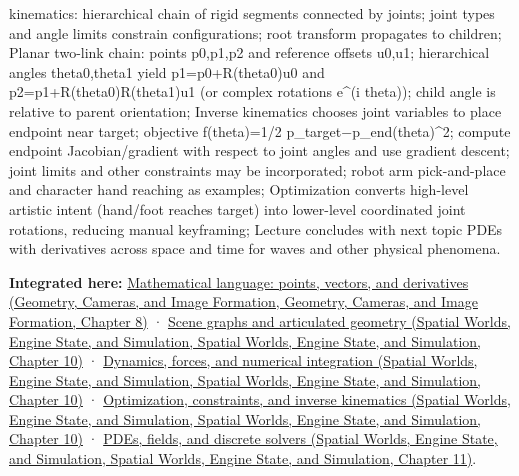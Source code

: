 kinematics: hierarchical chain of rigid segments connected by joints; joint types and angle limits constrain configurations; root transform propagates to children; Planar two-link chain: points p0,p1,p2 and reference offsets u0,u1; hierarchical angles theta0,theta1 yield p1=p0+R(theta0)u0 and p2=p1+R(theta0)R(theta1)u1 (or complex rotations e\^{}(i theta)); child angle is relative to parent orientation; Inverse kinematics chooses joint variables to place endpoint near target; objective f(theta)=1/2 \textbar\textbar p\_target−p\_end(theta)\textbar\textbar\^{}2; compute endpoint Jacobian/gradient with respect to joint angles and use gradient descent; joint limits and other constraints may be incorporated; robot arm pick-and-place and character hand reaching as examples; Optimization converts high-level artistic intent (hand/foot reaches target) into lower-level coordinated joint rotations, reducing manual keyframing; Lecture concludes with next topic PDEs with derivatives across space and time for waves and other physical phenomena.

\textbf{Integrated here:} \href{../03-Geometry-Cameras-and-Image-Formation/main.pdf\#nameddest=03-visual-computing-i-ch001-mathematical-language-points-vectors-and-derivatives}{Mathematical language: points, vectors, and derivatives (Geometry, Cameras, and Image Formation, Geometry, Cameras, and Image Formation, Chapter 8)} · \href{../05-Spatial-Worlds-Engine-State-and-Simulation/main.pdf\#nameddest=04-visual-computing-ii-ch029-scene-graphs-and-articulated-geometry}{Scene graphs and articulated geometry (Spatial Worlds, Engine State, and Simulation, Spatial Worlds, Engine State, and Simulation, Chapter 10)} · \href{../05-Spatial-Worlds-Engine-State-and-Simulation/main.pdf\#nameddest=04-visual-computing-ii-ch029-dynamics-forces-and-numerical-integration}{Dynamics, forces, and numerical integration (Spatial Worlds, Engine State, and Simulation, Spatial Worlds, Engine State, and Simulation, Chapter 10)} · \href{../05-Spatial-Worlds-Engine-State-and-Simulation/main.pdf\#nameddest=04-visual-computing-ii-ch029-optimization-constraints-and-inverse-kinematics}{Optimization, constraints, and inverse kinematics (Spatial Worlds, Engine State, and Simulation, Spatial Worlds, Engine State, and Simulation, Chapter 10)} · \href{../05-Spatial-Worlds-Engine-State-and-Simulation/main.pdf\#nameddest=04-visual-computing-ii-ch030-pdes-fields-and-discrete-solvers}{PDEs, fields, and discrete solvers (Spatial Worlds, Engine State, and Simulation, Spatial Worlds, Engine State, and Simulation, Chapter 11)}.

